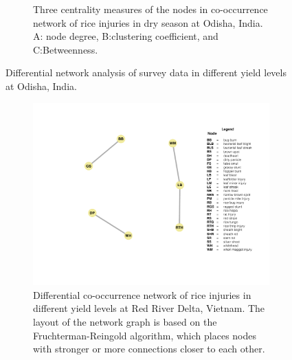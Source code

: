 \begin{figure}
\begin{subfigure}[b]{1\textwidth}
        \caption[Three centrality measures of the nodes in co-occurrence network of rice injuries in dry season at Odisha, India.]{Three centrality measures of the nodes in co-occurrence network of rice injuries in dry season at Odisha, India. A: node degree, B:clustering coefficient, and C:Betweenness.}
        \label{fig:nodepropdifyield_OD}
    \end{subfigure}
    \caption{Differential network analysis of survey data in different yield levels at Odisha, India.}
    \label{fig:difyield_OD}
\end{figure}
 
 \begin{figure}
    \centering
    \begin{subfigure}[b]{1\textwidth}
        \includegraphics[width = 1\textwidth]{figures/difyieldRR.pdf}
        \caption[Differential co-occurrence network of rice injuries in different yield levels at Red River Delta, Vietnam. ]{Differential co-occurrence network of rice injuries in different yield levels at Red River Delta, Vietnam. The layout of the network graph is based on the Fruchterman-Reingold algorithm, which places nodes with stronger or more connections closer to each other.}
        \label{fig:difyieldnetwork_RR}
    \end{subfigure}
    \begin{subfigure}[b]{1\textwidth}

\end{subfigure}
\end{figure}
